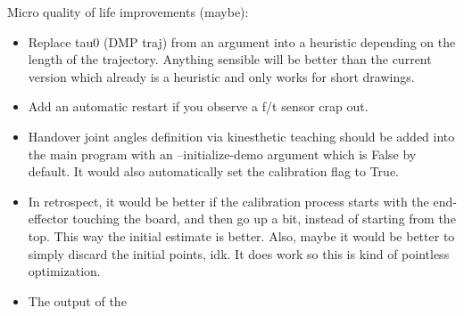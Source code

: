 \documentclass{article}
\begin{document}
Micro quality of life improvements (maybe):
\begin{itemize}
		\item Replace tau0 (DMP traj) from an argument into a heuristic depending on the length
				of the trajectory. Anything sensible will be better than the current version
				which already is a heuristic and only works for short drawings.
		\item Add an automatic restart if you observe a f/t sensor crap out.
\item Handover joint angles definition via kinesthetic teaching should be added into the main program with an --initialize-demo argument
which is False by default. It would also automatically set the calibration flag to True.
\item In retrospect, it would be better if the calibration process
starts with the end-effector touching the board, and then go up a bit,
instead of starting from the top. This way the initial estimate is better.
Also, maybe it would be better to simply discard the initial points, idk.
It does work so this is kind of pointless optimization.
\item The output of the 
\end{itemize}
\end{document}
